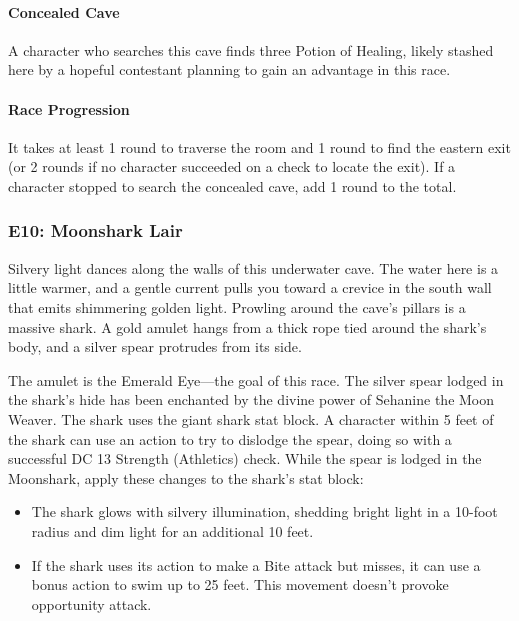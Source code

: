 \documentclass[10pt,a4paper,twoside,twocolumn,openany,nodeprecatedcode]{dndbook}
\begin{document}
\paragraph{Concealed Cave}
A character who searches this cave finds three Potion of Healing, likely stashed here by a hopeful contestant planning to gain an advantage in this race.

\paragraph{Race Progression}
It takes at least 1 round to traverse the room and 1 round to find the eastern exit (or 2 rounds if no character succeeded on a check to locate the exit). If a character stopped to search the concealed cave, add 1 round to the total.

\subsubsection{E10: Moonshark Lair}
\begin{DndReadAloud}{}
Silvery light dances along the walls of this underwater cave. The water here is a little warmer, and a gentle current pulls you toward a crevice in the south wall that emits shimmering golden light. Prowling around the cave's pillars is a massive shark. A gold amulet hangs from a thick rope tied around the shark's body, and a silver spear protrudes from its side.

\end{DndReadAloud}

The amulet is the Emerald Eye—the goal of this race. The silver spear lodged in the shark's hide has been enchanted by the divine power of Sehanine the Moon Weaver. The shark uses the giant shark stat block. A character within 5 feet of the shark can use an action to try to dislodge the spear, doing so with a successful DC 13 Strength (Athletics) check. While the spear is lodged in the Moonshark, apply these changes to the shark's stat block:


\begin{itemize}
\item The shark glows with silvery illumination, shedding bright light in a 10-foot radius and dim light for an additional 10 feet.
\item If the shark uses its action to make a Bite attack but misses, it can use a bonus action to swim up to 25 feet. This movement doesn't provoke opportunity attack.
\end{itemize}
\end{document}
